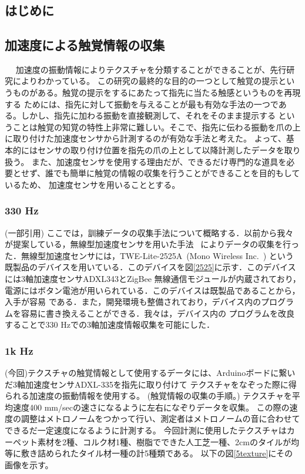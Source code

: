 ﻿\chapter{} \label{sec:proposal}
\section{はじめに}

\section{加速度による触覚情報の収集}　\label{sec:2.2}
	加速度の振動情報によりテクスチャを分類することができることが、先行研究によりわかっている。
	この研究の最終的な目的の一つとして触覚の提示というものがある。触覚の提示をするにあたって指先に当たる触感というものを再現する
	ためには、指先に対して振動を与えることが最も有効な手法の一つである。しかし、指先に加わる振動を直接観測して、それをそのまま提示する
	ということは触覚の知覚の特性上非常に難しい。そこで、指先に伝わる振動を爪の上に取り付けた加速度センサから計測するのが有効な手法と考えた。
	よって、基本的にはセンサの取り付け位置を指先の爪の上として以降計測したデータを取り扱う。
	また、加速度センサを使用する理由だが、できるだけ専門的な道具を必要とせず、誰でも簡単に触覚の情報の収集を行うことができることを目的もしているため、
	加速度センサを用いることとする。
	\subsection{330 Hz}
	(一部引用) 
	ここでは，訓練データの収集手法について概略する．以前から我々が提案している，無線型加速度センサを用いた手法
	~\cite{PBL}によりデータの収集を行った．無線型加速度センサには，TWE-Lite-2525A~(Mono Wireless Inc.~\cite{2525})
	という既製品のデバイスを用いている．このデバイスを図\ref{2525}に示す．このデバイスには3軸加速度センサADXL343とZigBee 
	無線通信モジュールが内蔵されており，電源にはボタン電池が用いられている．このデバイスは既製品であることから，入手が容易
	である．また，開発環境も整備されており，デバイス内のプログラムを容易に書き換えることができる．我々は，デバイス内の
	プログラムを改良することで330 Hzでの3軸加速度情報収集を可能にした．

	\subsection{1k Hz}
		(今回)テクスチャの触覚情報として使用するデータには、Arduinoボードに繋いだ3軸加速度センサADXL-335を指先に取り付けて
		テクスチャをなぞった際に得られる加速度の振動情報を使用する。
		(触覚情報の収集の手順。)
		テクスチャを平均速度400 mm/secの速さになるように左右になぞりデータを収集。
		この際の速度の調整はメトロノームをつかって行い、測定者はメトロノームの音に合わせてできるだ一定速度になるように計測する。
		今回計測に使用したテクスチャはカーペット素材を2種、コルク材1種、樹脂でできた人工芝一種、2cmのタイルが均等に敷き詰められたタイル材一種の計5種類である。
		以下の図\ref{5texture}にその画像を示す。
	
